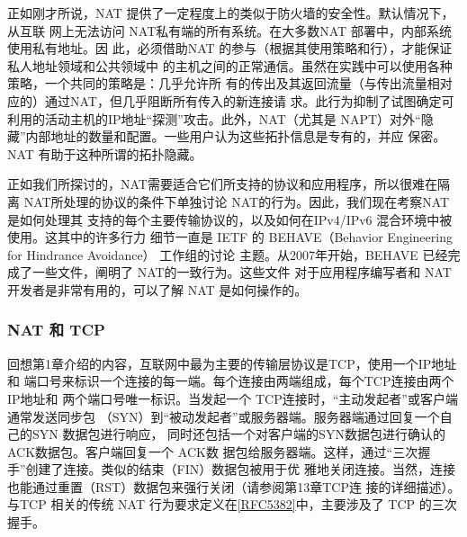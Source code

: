 正如刚才所说，NAT 提供了一定程度上的类似于防火墙的安全性。默认情况下，从互联
网上无法访问 NAT私有端的所有系统。在大多数NAT 部署中，内部系统使用私有地址。因
此，必须借助NAT 的参与（根据其使用策略和行），才能保证私人地址领域和公共领域中
的主机之间的正常通信。虽然在实践中可以使用各种策略，一个共同的策略是：几乎允许所
有的传出及其返回流量（与传出流量相对应的）通过NAT，但几乎阻断所有传入的新连接请
求。此行为抑制了试图确定可利用的活动主机的IP地址“探测”攻击。此外，NAT（尤其是
NAPT）对外“隐藏”内部地址的数量和配置。一些用户认为这些拓扑信息是专有的，并应
保密。NAT 有助于这种所谓的拓扑隐藏。

正如我们所探讨的，NAT需要适合它们所支持的协议和应用程序，所以很难在隔离
NAT所处理的协议的条件下单独讨论 NAT的行为。因此，我们现在考察NAT是如何处理其
支持的每个主要传输协议的，以及如何在IPv4/IPv6 混合环境中被使用。这其中的许多行力
细节一直是 IETF 的 BEHAVE（Behavior Engineering for Hindrance Avoidance） 工作组的讨论
主题。从2007年开始，BEHAVE 已经完成了一些文件，阐明了 NAT的一致行为。这些文件
对于应用程序编写者和 NAT 开发者是非常有用的，可以了解 NAT 是如何操作的。

\subsubsection{NAT 和 TCP}

回想第1章介绍的内容，互联网中最为主要的传输层协议是TCP，使用一个IP地址和
端口号来标识一个连接的每一端。每个连接由两端组成，每个TCP连接由两个IP地址和
两个端口号唯一标识。当发起一个 TCP连接时，“主动发起者”或客户端通常发送同步包
（SYN）到“被动发起者”或服务器端。服务器端通过回复一个自己的SYN 数据包进行响应，
同时还包括一个对客户端的SYN数据包进行确认的ACK数据包。客户端回复一个 ACK数
据包给服务器端。这样，通过“三次握手”创建了连接。类似的结束（FIN）数据包被用于优
雅地关闭连接。当然，连接也能通过重置（RST）数据包来强行关闭（请参阅第13章TCP连
接的详细描述）。与TCP 相关的传统 NAT
行为要求定义在\href{https://www.rfc-editor.org/rfc/rfc5382}{[RFC5382]}中，主要涉及了 TCP
的三次握手。

